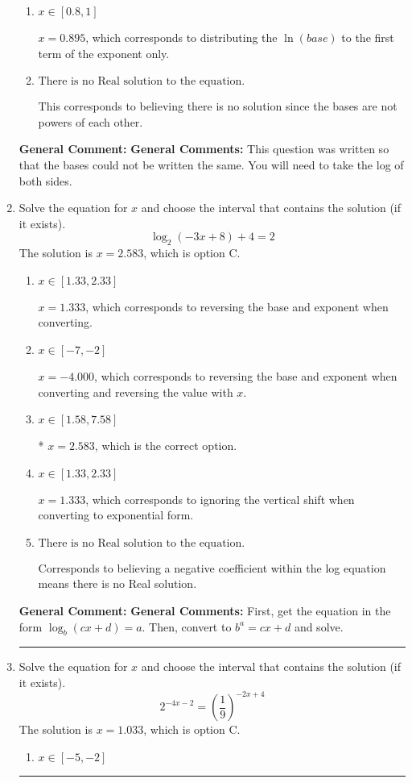 \documentclass{extbook}[14pt]
\newcommand{\litem}[1]{\item #1

\rule{\textwidth}{0.4pt}}
\begin{document}
\begin{enumerate}
{\begin{enumerate}[label=\Alph*.]
$x = -8.000$, which corresponds to solving the numerators as equal while ignoring the bases are different.
\item \( x \in [0.8, 1] \)

$x = 0.895$, which corresponds to distributing the $\ln(base)$ to the first term of the exponent only.
\item \( \text{There is no Real solution to the equation.} \)

This corresponds to believing there is no solution since the bases are not powers of each other.
\end{enumerate}

\textbf{General Comment:} \textbf{General Comments:} This question was written so that the bases could not be written the same. You will need to take the log of both sides.
}
\litem{
Solve the equation for $x$ and choose the interval that contains the solution (if it exists).
\[ \log_{2}{(-3x+8)}+4 = 2 \]The solution is \( x = 2.583 \), which is option C.\begin{enumerate}[label=\Alph*.]
\item \( x \in [1.33, 2.33] \)

$x = 1.333$, which corresponds to reversing the base and exponent when converting.
\item \( x \in [-7, -2] \)

$x = -4.000$, which corresponds to reversing the base and exponent when converting and reversing the value with $x$.
\item \( x \in [1.58, 7.58] \)

* $x = 2.583$, which is the correct option.
\item \( x \in [1.33, 2.33] \)

$x = 1.333$, which corresponds to ignoring the vertical shift when converting to exponential form.
\item \( \text{There is no Real solution to the equation.} \)

Corresponds to believing a negative coefficient within the log equation means there is no Real solution.
\end{enumerate}

\textbf{General Comment:} \textbf{General Comments:} First, get the equation in the form $\log_b{(cx+d)} = a$. Then, convert to $b^a = cx+d$ and solve.
}
\litem{
Solve the equation for $x$ and choose the interval that contains the solution (if it exists).
\[ 2^{-4x-2} = \left(\frac{1}{9}\right)^{-2x+4} \]The solution is \( x = 1.033 \), which is option C.\begin{enumerate}[label=\Alph*.]
\item \( x \in [-5, -2] \)


\end{enumerate}}
\end{enumerate}
\end{document}
